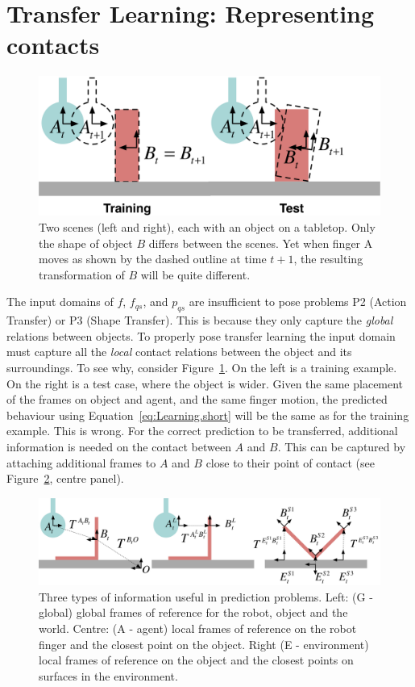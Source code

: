 \section{Transfer Learning: Representing contacts}
\label{sec:InfoForPrediction}
\begin{figure}[t]
\centerline{\includegraphics[width=\columnwidth]{shapes-colour}}
\caption[Shapes]{Two scenes (left and right),
each with an object on a tabletop. Only the shape of object $B$ differs between the scenes. Yet when finger A moves as shown by the dashed outline at time $t+1$, the resulting transformation of $B$ will be quite different.}
\label{fig:Learning.shapes}
\end{figure}
The input domains of $f$, $f_{qs}$, and $p_{qs}$ are insufficient to pose problems P2 (Action Transfer) or P3 (Shape Transfer). This is because they only capture the {\em global} relations between objects. To properly pose transfer learning the input domain must capture all the {\em local} contact relations between the object and its surroundings.  To see why, consider Figure~\ref{fig:Learning.shapes}. On the left is a training example. On the right is a test case, where the object is wider. Given the same placement of the frames on object and agent, and the same finger motion, the predicted behaviour using Equation~\eqref{eq:Learning.short} will be the same as for the training example. This is wrong. For the correct prediction to be transferred, additional information is needed on the contact between $A$ and $B$. This can be captured by attaching additional frames to $A$ and $B$ close to their point of contact (see Figure~\ref{fig:Learning.setup2}, centre panel).
\begin{figure}[t]
\centerline{\includegraphics[width=\textwidth]{information}}
\caption{Three types of information useful in prediction problems. Left: (G - global) global frames of reference for the robot, object and the world. Centre: (A - agent) local frames of reference on the robot finger and the closest point on the object. Right (E - environment) local frames of reference on the object and the closest points on surfaces in the environment.}
\label{fig:Learning.setup2}
\end{figure}
